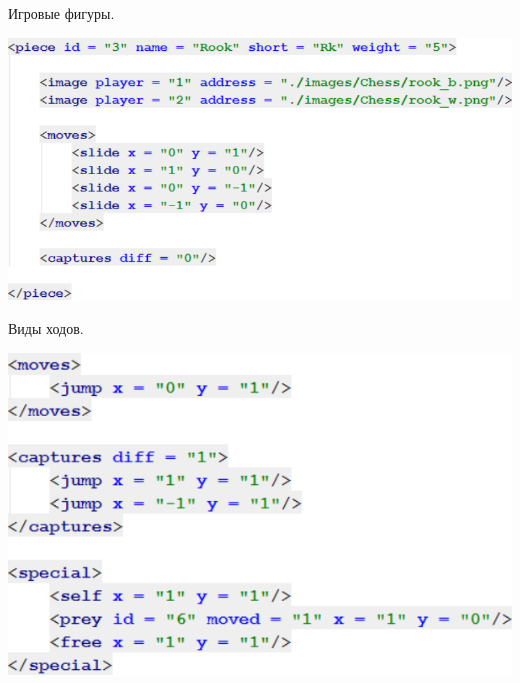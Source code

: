 \documentclass[11pt,slides,aspectratio=43]{beamer}
\begin{document}
	\begin{frame}{Игровые фигуры.}
		\begin{block}{}
        	\begin{center}
	    		\includegraphics[scale=0.5]{attributes.png}
    		\end{center}
		\end{block}
	\end{frame}
	
	\begin{frame}{Виды ходов.}
		\begin{block}{}
        	\begin{center}
	    		\includegraphics[scale=0.5]{move.png}
    		\end{center}
		\end{block}
	\end{frame}
	
\end{document}

